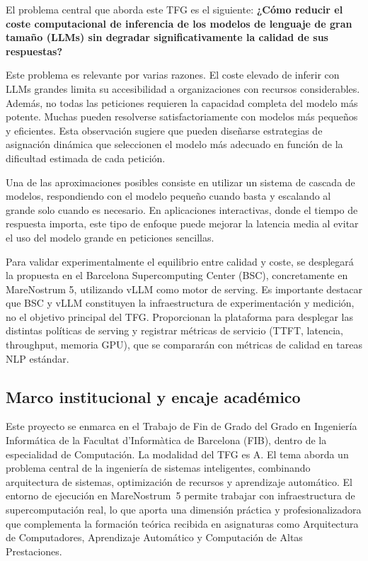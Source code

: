 \documentclass[11pt,a4paper]{article}
\begin{document}
El problema central que aborda este TFG es el siguiente: \textbf{¿Cómo reducir el coste computacional de inferencia de los modelos de lenguaje de gran tamaño (LLMs) sin degradar significativamente la calidad de sus respuestas?}

Este problema es relevante por varias razones. El coste elevado de inferir con LLMs grandes limita su accesibilidad a organizaciones con recursos considerables. Además, no todas las peticiones requieren la capacidad completa del modelo más potente. Muchas pueden resolverse satisfactoriamente con modelos más pequeños y eficientes. Esta observación sugiere que pueden diseñarse estrategias de asignación dinámica que seleccionen el modelo más adecuado en función de la dificultad estimada de cada petición.

Una de las aproximaciones posibles consiste en utilizar un sistema de cascada de modelos, respondiendo con el modelo pequeño cuando basta y escalando al grande solo cuando es necesario. En aplicaciones interactivas, donde el tiempo de respuesta importa, este tipo de enfoque puede mejorar la latencia media al evitar el uso del modelo grande en peticiones sencillas.

Para validar experimentalmente el equilibrio entre calidad y coste, se desplegará la propuesta en el Barcelona Supercomputing Center (BSC), concretamente en MareNostrum 5, utilizando vLLM como motor de serving. Es importante destacar que BSC y vLLM constituyen la infraestructura de experimentación y medición, no el objetivo principal del TFG. Proporcionan la plataforma para desplegar las distintas políticas de serving y registrar métricas de servicio (TTFT, latencia, throughput, memoria GPU), que se compararán con métricas de calidad en tareas NLP estándar.
\subsection{Marco institucional y encaje académico}

Este proyecto se enmarca en el Trabajo de Fin de Grado del Grado en Ingeniería Informática de la Facultat d'Informàtica de Barcelona (FIB), dentro de la especialidad de Computación. La modalidad del TFG es A. El tema aborda un problema central de la ingeniería de sistemas inteligentes, combinando arquitectura de sistemas, optimización de recursos y aprendizaje automático. El entorno de ejecución en MareNostrum~5 permite trabajar con infraestructura de supercomputación real, lo que aporta una dimensión práctica y profesionalizadora que complementa la formación teórica recibida en asignaturas como Arquitectura de Computadores, Aprendizaje Automático y Computación de Altas Prestaciones.
\end{document}
